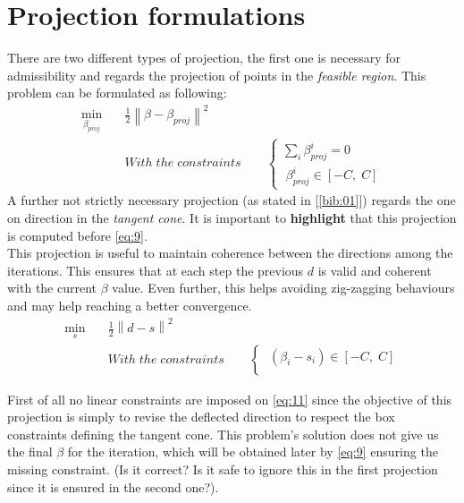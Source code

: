 \documentclass[12pt]{article}
\newcommand{\norm}[1]{\left\lVert#1\right\rVert}
\begin{document}
    \section*{Projection formulations}
    
    There are two different types of projection, the first one is necessary for admissibility and regards the projection of points in the \textit{feasible region}. This problem can be formulated as following:
    \begin{equation}\label{eq:9}
	    \begin{aligned}
	    \min_{\beta_{proj}} \quad &\frac{1}{2}\norm{\beta - \beta_{proj}}^2\\ 
		&With\;the\;constraints\qquad
        \begin{cases}
            \sum_i \beta_{proj}^i = 0 \\
            \;\beta_{proj}^i\in[-C,\;C] 
        \end{cases}
        \end{aligned}
	\end{equation}
    A further not strictly necessary projection (as stated in [\ref{bib:01}]) regards the one on direction in the \textit{tangent cone}. It is important to \textbf{highlight} that this projection is computed before \eqref{eq:9}.\\This projection is useful to maintain coherence between the directions among the iterations. This ensures that at each step the previous $d$ is valid and coherent with the current $\beta$ value. Even further, this helps avoiding zig-zagging behaviours and may help reaching a better convergence.
    \begin{equation}\label{eq:11}
	    \begin{aligned}
	    \min_{s} \quad &\frac{1}{2}\norm{d - s}^2\\
	    &With\;the\;constraints\qquad
        \begin{cases}
            \;(\beta_i -s_i)\in[-C,\;C]\\
        \end{cases}
        \end{aligned}
	\end{equation}
	
	First of all no linear constraints are imposed on \eqref{eq:11} since the objective of this projection is simply to revise the deflected direction to respect the box constraints defining the tangent cone. This problem's solution does not give us the final $\beta$ for the iteration, which will be obtained later by \eqref{eq:9} ensuring the missing constraint. (Is it correct? Is it safe to ignore this in the first projection since it is ensured in the second one?).
	
\end{document}
